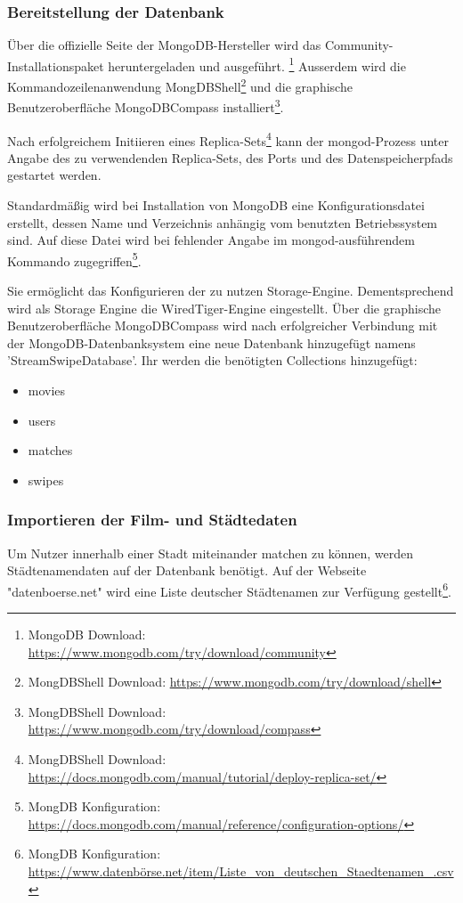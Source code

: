 \subsubsection{Bereitstellung der Datenbank}
Über die offizielle Seite der MongoDB-Hersteller wird das Community-Installationspaket heruntergeladen und ausgeführt. \footnote{MongoDB Download: \url{ https://www.mongodb.com/try/download/community}}
Ausserdem wird die Kommandozeilenanwendung MongDBShell\footnote{MongDBShell Download: \url{ https://www.mongodb.com/try/download/shell}} und die
graphische Benutzeroberfläche MongoDBCompass installiert\footnote{MongDBShell Download: \url{https://www.mongodb.com/try/download/compass}}. 

Nach erfolgreichem Initiieren eines Replica-Sets\footnote{MongDBShell Download: \url{https://docs.mongodb.com/manual/tutorial/deploy-replica-set/}}
kann der mongod-Prozess unter Angabe des zu verwendenden Replica-Sets, des Ports und des Datenspeicherpfads gestartet werden. \newline


\noindent
Standardmäßig wird bei Installation von MongoDB eine Konfigurationsdatei erstellt, dessen Name und Verzeichnis anhängig vom benutzten Betriebssystem sind. Auf diese Datei wird bei fehlender Angabe im mongod-ausführendem Kommando zugegriffen\footnote{MongDB Konfiguration: \url{https://docs.mongodb.com/manual/reference/configuration-options/}}.

Sie ermöglicht das Konfigurieren der zu nutzen Storage-Engine. Dementsprechend wird als Storage Engine die WiredTiger-Engine eingestellt. 
Über die graphische Benutzeroberfläche MongoDBCompass wird nach erfolgreicher Verbindung mit der MongoDB-Datenbanksystem eine neue Datenbank hinzugefügt namens 'StreamSwipeDatabase'. Ihr werden die benötigten Collections hinzugefügt:

\begin{itemize}
\item movies
\item users
\item matches
\item swipes
\end{itemize}

\subsubsection{Importieren der Film- und Städtedaten}
Um Nutzer innerhalb einer Stadt miteinander matchen zu können, werden Städtenamendaten auf der Datenbank benötigt. Auf der Webseite "datenboerse.net" wird eine Liste deutscher Städtenamen zur Verfügung gestellt\footnote{MongDB Konfiguration: \url{https://www.datenbörse.net/item/Liste_von_deutschen_Staedtenamen_.csv}}.\newline

